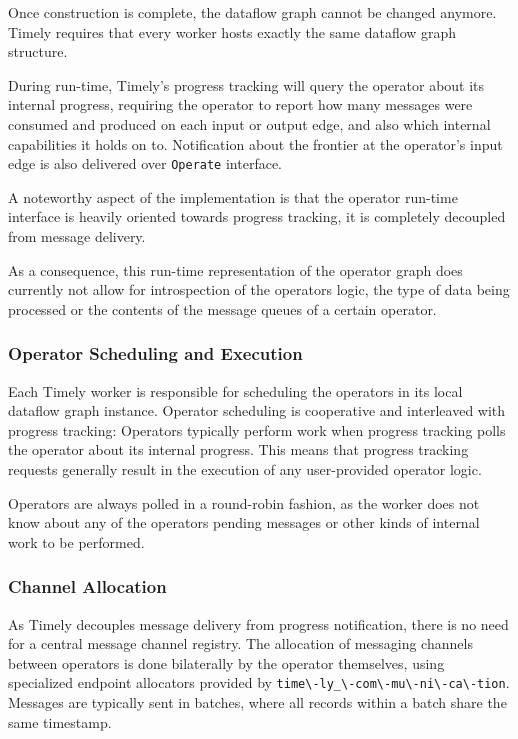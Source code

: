 Once construction is complete, the dataflow graph cannot be changed anymore.
Timely requires that every worker hosts exactly the same dataflow graph
structure.

During run-time, Timely's progress tracking will query the operator about its
internal progress, requiring the operator to report how many messages were
consumed and produced on each input or output edge, and also which internal
capabilities it holds on to. Notification about the frontier at the
operator's input edge is also delivered over \lstinline{Operate} interface.

A noteworthy aspect of the implementation is that the operator run-time interface
is heavily oriented towards progress tracking, it is completely decoupled
from message delivery.

As a consequence, this run-time representation of the operator graph does
currently not allow for introspection of the operators logic, the type of data
being processed or the contents of the message queues of a certain operator.

\subsubsection{Operator Scheduling and Execution}

Each Timely worker is responsible for scheduling the operators in its local
dataflow graph instance. Operator scheduling is cooperative and interleaved 
with progress tracking: Operators typically perform work when progress tracking
polls the operator about its internal progress. This means that progress
tracking requests generally result in the execution of any user-provided
operator logic.

Operators are always polled in a round-robin fashion, as the worker does
not know about any of the operators pending messages or other kinds of
internal work to be performed.

\subsubsection{Channel Allocation}

As Timely decouples message delivery from progress notification, there is no
need for a central message channel registry. The allocation of messaging
channels between operators is done bilaterally by the operator themselves,
using specialized endpoint allocators provided by
\lstinline{time\-ly_\-com\-mu\-ni\-ca\-tion}. Messages are typically sent in
batches, where all records within a batch share the same timestamp.

